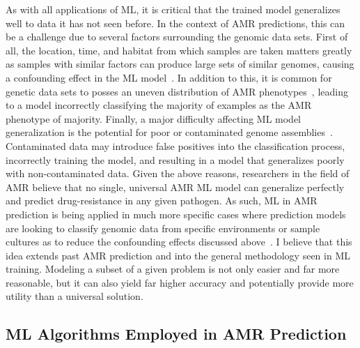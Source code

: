 \documentclass{article}
\begin{document}
As with all applications of ML, it is critical that the trained model generalizes well to data it has not seen before. In the context of AMR predictions, this can be a challenge due to several factors surrounding the genomic data sets. First of all, the location, time, and habitat from which samples are taken matters greatly as samples with similar factors can produce large sets of similar genomes, causing a confounding effect in the ML model~\cite{kim_machine_2022}. In addition to this, it is common for genetic data sets to posses an uneven distribution of AMR phenotypes~\cite{kim_machine_2022}, leading to a model incorrectly classifying the majority of examples as the AMR phenotype of majority. Finally, a major difficulty affecting ML model generalization is the potential for poor or contaminated genome assemblies~\cite{kim_machine_2022}. Contaminated data may introduce false positives into the classification process, incorrectly training the model, and resulting in a model that generalizes poorly with non-contaminated data. Given the above reasons, researchers in the field of AMR believe that no single, universal AMR ML model can generalize perfectly and predict drug-resistance in any given pathogen. As such, ML in AMR prediction is being applied in much more specific cases where prediction models are looking to classify genomic data from specific environments or sample cultures as to reduce the confounding effects discussed above~\cite{kim_machine_2022}. I believe that this idea extends past AMR prediction and into the general methodology seen in ML training. Modeling a subset of a given problem is not only easier and far more reasonable, but it can also yield far higher accuracy and potentially provide more utility than a universal solution.

\subsection{ML Algorithms Employed in AMR Prediction}
\end{document}
